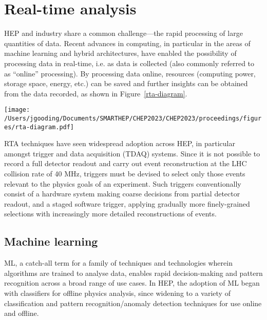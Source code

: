 \section{Real-time analysis}
\label{rta}
HEP and industry share a common challenge—the rapid processing of large quantities of data. \cite{hu-big-data} Recent advances in computing, in particular in the areas of machine learning and hybrid architectures, have enabled the possibility of processing data in real-time, i.e. as data is collected (also commonly referred to as ``online'' processing). \cite{real-time-computing} By processing data online, resources (computing power, storage space, energy, etc.) can be saved and further insights can be obtained from the data recorded, as shown in Figure~\ref{rta-diagram}. \par

\begin{figure*}[h!]
    \centering
    \texttt{[image: /Users/jgooding/Documents/SMARTHEP/CHEP2023/CHEP2023/proceedings/figures/rta-diagram.pdf]}
    \caption{Traditional and RTA approaches to data processing. Traditional approaches rely on recording all data and processing this offilne; in RTA, data is processed as it is produced, recording only the relevant portions, enabling greater volumes of processed data to be stored.}
    \label{rta-diagram}       %
\end{figure*}

RTA techniques have seen widespread adoption across HEP, in particular amongst trigger and data acquisition (TDAQ) systems. Since it is not possible to record a full detector readout and carry out event reconstruction at the LHC collision rate of {40}{ MHz}, triggers must be devised to select only those events relevant to the physics goals of an experiment. Such triggers conventionally consist of a hardware system making coarse decisions from partial detector readout, and a staged software trigger, applying gradually more finely-grained selections with increasingly more detailed reconstructions of events.

\subsection{Machine learning}
\label{machine-learning}
ML, a catch-all term for a family of techniques and technologies wherein algorithms are trained to analyse data, enables rapid decision-making and pattern recognition across a broad range of use cases. \cite{intro-ml} In HEP, the adoption of ML began with classifiers for offline physics analysis, since widening to a variety of classification and pattern recognition/anomaly detection techniques for use online and offline. \cite{albertsson-ml}\par

